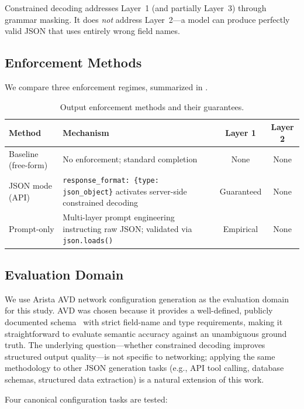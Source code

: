 \documentclass[11pt, letterpaper]{article}
\begin{document}
Constrained decoding addresses Layer~1 (and partially Layer~3) through grammar masking. It does \emph{not} address Layer~2---a model can produce perfectly valid JSON that uses entirely wrong field names.

\subsection{Enforcement Methods}
\label{sec:enforcement}

We compare three enforcement regimes, summarized in .

\begin{table}[H]
\centering
\caption{Output enforcement methods and their guarantees.}
\label{tab:enforcement_methods}
\begin{tabularx}{\textwidth}{l X c c}
\toprule
\textbf{Method} & \textbf{Mechanism} & \textbf{Layer 1} & \textbf{Layer 2} \\
\midrule
Baseline (free-form) & No enforcement; standard completion & None & None \\
JSON mode (API) & \texttt{response\_format: \{type: json\_object\}} activates server-side constrained decoding & Guaranteed & None \\
Prompt-only & Multi-layer prompt engineering instructing raw JSON; validated via \texttt{json.loads()} & Empirical & None \\
\bottomrule
\end{tabularx}
\end{table}

\subsection{Evaluation Domain}
\label{sec:domain}

We use Arista AVD network configuration generation as the evaluation domain for this study. AVD was chosen because it provides a well-defined, publicly documented schema~\cite{avd_docs} with strict field-name and type requirements, making it straightforward to evaluate semantic accuracy against an unambiguous ground truth. The underlying question---whether constrained decoding improves structured output quality---is not specific to networking; applying the same methodology to other JSON generation tasks (e.g., API tool calling, database schemas, structured data extraction) is a natural extension of this work.

Four canonical configuration tasks are tested:
\end{document}
